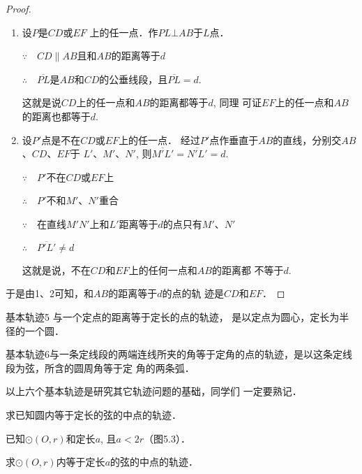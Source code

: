 \begin{proof}
\begin{enumerate}
    \item 设$P$是$CD$或$EF$ 上的任一点．作$PL\bot AB$于$L$点．

$\because\quad CD\parallel AB$且和$AB$的距离等于$d$

$\therefore\quad \overline{PL}$是$AB$和$CD$的公垂线段，且$\overline{PL}=d$.

这就是说$CD$上的任一点和$AB$的距离都等于$d$, 同理
可证$EF$上的任一点和$AB$的距离也都等于$d$.
\item 设$P'$点是不在$CD$或$EF$上的任一点．
经过$P'$点作垂直于$AB$的直线，分别交$AB$、$CD$、$EF$于
$L'$、$M'$、$N'$, 则$\overline{M'L'}=\overline{N'L'}=d$.

$\because\quad P'$不在$CD$或$EF$上

$\therefore\quad P'$不和$M'$、$N'$重合

$\because\quad $在直线$M'N'$上和$L'$距离等于$d$的点只有$M'$、$N'$

$\therefore\quad \overline{P'L'}\ne d$

这就是说，不在$CD$和$EF$上的任何一点和$AB$的距离都
不等于$d$.
\end{enumerate}

于是由1、2可知，和$AB$的距离等于$d$的点的轨
迹是$CD$和$EF$．
\end{proof}

\begin{blk}
    {基本轨迹5} 与一个定点的距离等于定长的点的轨迹，
是以定点为圆心，定长为半径的一个圆．
\end{blk}

\begin{blk}
    {基本轨迹6}与一条定线段的两端连线所夹的角等于定角的点的轨迹，是以这条定线段为弦，所含的圆周角等于定
    角的两条弧．
\end{blk}

以上六个基本轨迹是研究其它轨迹问题的基础，同学们
一定要熟记．

\begin{example}
    求已知圆内等于定长的弦的中点的轨迹．

    已知$\odot (O,r)$和定长$a$, 且$a<2r$（图5.3）．

    求$\odot (O,r)$内等于定长$a$的弦的中点的轨迹．
\end{example}

\begin{figure}[htp]
    \centering
{}
    \caption{}
\end{figure}

